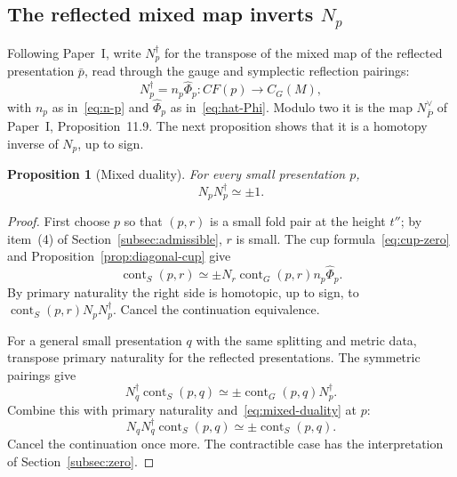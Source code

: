 \documentclass[11pt]{amsart}
\newtheorem{proposition}[theorem]{Proposition}
\theoremstyle{definition}
\theoremstyle{remark}
\theoremstyle{plain}
\numberwithin{equation}{section}
\newcommand{\CF}{\mathit{CF}}
\newcommand{\cont}{\operatorname{cont}}
\begin{document}
\subsection{The reflected mixed map inverts \texorpdfstring{$N_p$}{N\_p}}
Following Paper~I, write $N_p^\dagger$ for the
transpose of the mixed map of the reflected
presentation $\bar p$, read through the gauge
and symplectic reflection pairings:
\[
 N_p^\dagger=n_p\widehat\Phi_p:\CF(p)\longrightarrow C_G(M),
\]
with $n_p$ as in~\eqref{eq:n-p} and
$\widehat\Phi_p$ as in~\eqref{eq:hat-Phi}.
Modulo two it is the map $N_{\bar P}^\vee$ of
Paper~I, Proposition~11.9. The next proposition
shows that it is a homotopy inverse of $N_p$, up
to sign.

\begin{proposition}[Mixed duality]\label{prop:mixed-duality}
For every small presentation $p$,
\begin{equation}\label{eq:mixed-duality}
 N_pN_p^\dagger\simeq\pm1.
\end{equation}
\end{proposition}
\begin{proof}
First choose $p$ so that $(p,r)$ is a small fold pair at the height $t''$; by item~(4) of
Section~\ref{subsec:admissible}, $r$ is
small. The cup formula~\eqref{eq:cup-zero}
and Proposition~\ref{prop:diagonal-cup} give
\[
 \cont_S(p,r)\simeq
 \pm N_r\cont_G(p,r)n_p\widehat\Phi_p.
\]
By primary naturality the right side
is homotopic, up to sign, to
$\cont_S(p,r)N_pN_p^\dagger$.
Cancel the continuation equivalence.

For a general small presentation $q$
with the same splitting and metric data,
transpose primary naturality for the
reflected presentations. The symmetric
pairings give
\[
 N_q^\dagger\cont_S(p,q)\simeq
             \pm\cont_G(p,q)N_p^\dagger.
\]
Combine this with primary naturality
and~\eqref{eq:mixed-duality} at $p$:
\[
 N_qN_q^\dagger\cont_S(p,q)
             \simeq\pm\cont_S(p,q).
\]
Cancel the continuation once more.
The contractible case has the
interpretation of
Section~\ref{subsec:zero}.
\end{proof}
\end{document}
